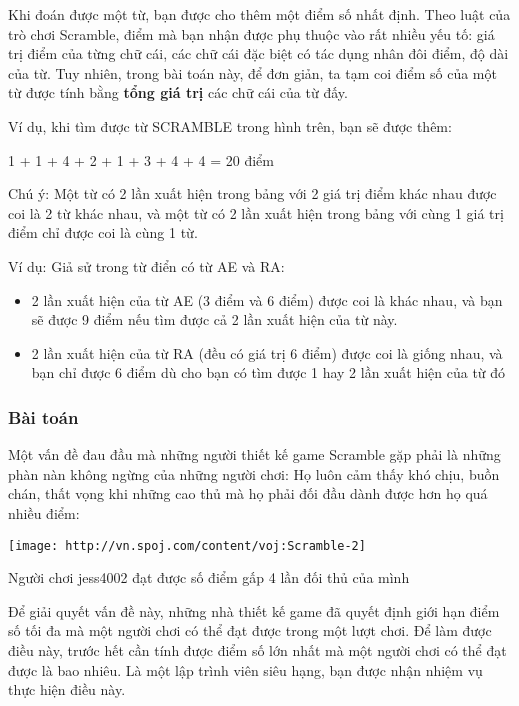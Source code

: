 Khi đoán được một từ, bạn được cho thêm một điểm số nhất định. Theo luật của trò chơi Scramble, điểm mà bạn nhận được phụ thuộc vào rất nhiều yếu tố: giá trị điểm của từng chữ cái, các chữ cái đặc biệt có tác dụng nhân đôi điểm, độ dài của từ. Tuy nhiên, trong bài toán này, để đơn giản, ta tạm coi điểm số của một từ được tính bằng \textbf{ tổng giá trị } các chữ cái của từ đấy.

Ví dụ, khi tìm được từ SCRAMBLE trong hình trên, bạn sẽ được thêm:

1 + 1 + 4 + 2 + 1 + 3 + 4 + 4 = 20 điểm

Chú ý: Một từ có 2 lần xuất hiện trong bảng với 2 giá trị điểm khác nhau được coi là 2 từ khác nhau, và một từ có 2 lần xuất hiện trong bảng với cùng 1 giá trị điểm chỉ được coi là cùng 1 từ.

Ví dụ: Giả sử trong từ điển có từ AE và RA:
\begin{itemize}
	\item 2 lần xuất hiện của từ AE (3 điểm và 6 điểm) được coi là khác nhau, và bạn sẽ được 9 điểm nếu tìm được cả 2 lần xuất hiện của từ này.
	\item 2 lần xuất hiện của từ RA (đều có giá trị 6 điểm) được coi là giống nhau, và bạn chỉ được 6 điểm dù cho bạn có tìm được 1 hay 2 lần xuất hiện của từ đó
\end{itemize}

\subsubsection{Bài toán}

Một vấn đề đau đầu mà những người thiết kế game Scramble gặp phải là những phàn nàn không ngừng của những người chơi: Họ luôn cảm thấy khó chịu, buồn chán, thất vọng khi những cao thủ mà họ phải đối đầu dành được hơn họ quá nhiều điểm:


\texttt{[image: http://vn.spoj.com/content/voj:Scramble-2]}

Người chơi jess4002 đạt được số điểm gấp 4 lần đối thủ của mình

Để giải quyết vấn đề này, những nhà thiết kế game đã quyết định giới hạn điểm số tối đa mà một người chơi có thể đạt được trong một lượt chơi. Để làm được điều này, trước hết cần tính được điểm số lớn nhất mà một người chơi có thể đạt được là bao nhiêu. Là một lập trình viên siêu hạng, bạn được nhận nhiệm vụ thực hiện điều này.

